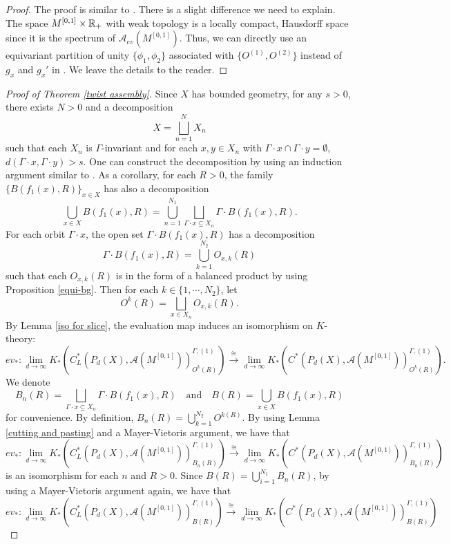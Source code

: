 \documentclass[11pt]{article}
\theoremstyle{definition}
\theoremstyle{plain}
\def\A{\mathcal A}\def\C{\mathcal C}\def\B{\mathcal B}\def\E{\mathcal E}\def\O{\mathcal O}\def\h{\mathfrak h}\def\K{\mathcal K}\def\F{\mathcal F}\def\P{\mathcal P}\def\L{\mathcal L}\def\R{\mathcal R}\def\Q{\mathcal Q}\def\H{\mathcal H}\def\S{\mathcal S}\def\N{\mathcal N}\def\U{\mathcal U}\def\V{\mathcal V}
\def\Ga{\Gamma}
\begin{document}
\begin{proof}
The proof is similar to \cite[Lemma 6.3]{Yu2000}. There is a slight difference we need to explain. The space $M^{[0,1]}\times\mathbb R_+$ with weak topology is a locally compact, Hausdorff space since it is the spectrum of $\A_{ev}(M^{[0,1]})$. Thus, we can directly use an equivariant partition of unity $\{\phi_1,\phi_2\}$ associated with $\{O^{(1)}, O^{(2)}\}$ instead of $g_x$ and $g_x'$ in \cite[Lemma 6.3]{Yu2000}. We leave the details to the reader.
\end{proof}

\begin{proof}[Proof of Theorem \ref{twist assembly}]
Since $X$ has bounded geometry, for any $s>0$, there exists $N>0$ and a decomposition
$$X=\bigsqcup_{n=1}^NX_n$$
such that each $X_n$ is $\Ga$-invariant and for each $x,y\in X_n$ with $\Ga\cdot x\cap\Ga\cdot y=\emptyset$, $d(\Ga\cdot x,\Ga\cdot y)>s$. One can construct the decomposition by using an induction argument similar to \cite[Lemma 12.2.3]{HIT2020}. As a corollary, for each $R>0$, the family $\{B(f_1(x),R)\}_{x\in X}$ has also a decomposition
$$\bigcup_{x\in X}B(f_1(x),R)=\bigcup_{n=1}^{N_1}\bigsqcup_{\Ga\cdot x\subseteq X_n}\Ga\cdot B(f_1(x),R).$$
For each orbit $\Ga\cdot x$, the open set $\Ga\cdot B(f_1(x),R)$ has a decomposition
$$\Ga\cdot B(f_1(x),R)=\bigcup_{k=1}^{N_2}O_{x,k}(R)$$
such that each $O_{x,k}(R)$ is in the form of a balanced product by using Proposition \ref{equi-bg}. Then for each $k\in\{1,\cdots,N_2\}$, let
$$O^k(R)=\bigsqcup_{x\in X_n}O_{x,k}(R).$$
By Lemma \ref{iso for slice}, the evaluation map induces an isomorphism on $K$-theory:
$$ev_*:\lim_{d\to\infty}K_*\left(C^*_L(P_d(X),\A(M^{[0,1]}))^{\Ga,(1)}_{O^k(R)}\right)\xrightarrow{\cong}\lim_{d\to\infty}K_*\left(C^*(P_d(X),\A(M^{[0,1]}))^{\Ga,(1)}_{O^k(R)}\right).$$
We denote 
$$B_n(R)=\bigsqcup_{\Ga\cdot x\subseteq X_n}\Ga\cdot B(f_1(x),R)\quad\text{and}\quad B(R)=\bigcup_{x\in X}B(f_1(x),R)$$
for convenience. By definition, $B_n(R)=\bigcup_{k=1}^{N_2}O^{k(R)}$. By using Lemma \ref{cutting and pasting} and a Mayer-Vietoris argument, we have that
$$ev_*:\lim_{d\to\infty}K_*\left(C^*_L(P_d(X),\A(M^{[0,1]}))^{\Ga,(1)}_{B_n(R)}\right)\xrightarrow{\cong}\lim_{d\to\infty}K_*\left(C^*(P_d(X),\A(M^{[0,1]}))^{\Ga,(1)}_{B_n(R)}\right)$$
is an isomorphism for each $n$ and $R>0$. Since $B(R)=\bigcup_{i=1}^{N_1}B_n(R)$, by using a Mayer-Vietoris argument again, we have that
$$ev_*:\lim_{d\to\infty}K_*\left(C^*_L(P_d(X),\A(M^{[0,1]}))^{\Ga,(1)}_{B(R)}\right)\xrightarrow{\cong}\lim_{d\to\infty}K_*\left(C^*(P_d(X),\A(M^{[0,1]}))^{\Ga,(1)}_{B(R)}\right)$$

\end{proof}
\end{document}
